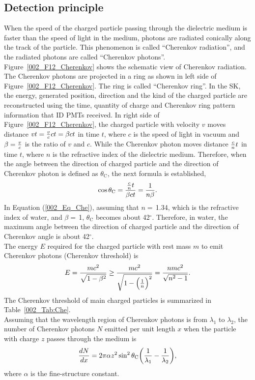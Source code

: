 \subsection{Detection principle}
\vs\hs When the speed of the charged particle passing through the dielectric medium is faster than the speed of light in the medium, photons are radiated conically along the track of the particle.
This phenomenon is called ``Cherenkov radiation'', and the radiated photons are called ``Cherenkov photons''.
Figure~\ref{002_F12_Cherenkov} shows the schematic view of Cherenkov radiation.
The Cherenkov photons are projected in a ring as shown in left side of Figure~\ref{002_F12_Cherenkov}.
The ring is called ``Cherenkov ring''.
In the SK, the energy, generated position, direction and the kind of the charged particle are reconstructed using the time, quantity of charge and Cherenkov ring pattern information that ID PMTs received.
In right side of Figure~\ref{002_F12_Cherenkov}, the charged particle with velocity $v$ moves distance $vt={v \over c}ct=\beta ct$ in time $t$, where $c$ is the speed of light in vacuum and $\beta={v \over c}$ is the ratio of $v$ and $c$.
While the Cherenkov photon moves distance ${c \over n}t$ in time $t$, where $n$ is the refractive index of the dielectric medium.
Therefore, when the angle between the direction of charged particle and the direction of Cherenkov photon is defined as $\theta_{\text{C}}$, the next formula is established,
\begin{eqnarray}\label{002_Eq_Che}
	\cos\theta_{\text{C}}={{c \over n}t \over \beta ct}={\text{1} \over n\beta}.
\end{eqnarray}
In Equation (\ref{002_Eq_Che}), assuming that $n=\,$1.34, which is the refractive index of water, and $\beta=\,$1, $\theta_{\text{C}}$ becomes about 42$^{\circ}$.
Therefore, in water, the maximum angle between the direction of charged particle and the direction of Cherenkov angle is about 42$^{\circ}$.\\
\hs The energy $E$ required for the charged particle with rest mass $m$ to emit Cherenkov photons (Cherenkov threshold) is
\begin{eqnarray}
	E={mc^{\text{2}} \over \sqrt{\text{1}-\beta^{\text{2}}}}\geq{mc^{\text{2}} \over \sqrt{\text{1}-\Big({\text{1} \over n}\Big)^{\text{2}}}}={nmc^{\text{2}} \over \sqrt{n^{\text{2}}-\text{1}}}.
\end{eqnarray}
The Cherenkov threshold of main charged particles is summarized in Table~\ref{002_Tab:Che}.\\
\hs Assuming that the wavelength region of Cherenkov photons is from $\lambda_{\text{1}}$ to $\lambda_{\text{2}}$, the number of Cherenkov photons $N$ emitted per unit length $x$ when the particle with charge $z$ passes through the medium is
\begin{eqnarray}
	{dN \over dx}=\text{2}\pi\alpha z^{\text{2}}\sin ^{\text{2}} \theta_{\text{C}}\bigg({\text{1} \over \lambda_{\text{1}}}-{\text{1} \over \lambda_{\text{2}}}\bigg),
\end{eqnarray}
where $\alpha$ is the fine-structure constant.

